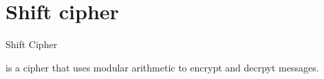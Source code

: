 \section{Shift cipher}

\begin{defn}

  Shift Cipher
  
\end{defn}
is a cipher that uses modular arithmetic to encrypt and decrpyt messages.

